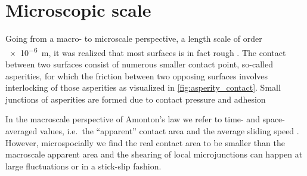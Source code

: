 










\section{Microscopic scale}
Going from a macro- to microscale perspective, a length scale of order
\SI{e-6}{m}, it was realized that most surfaces is in fact rough
\cite{mo_friction_2009}. The contact between two surfaces consist of numerous
smaller contact point, so-called asperities, for which the friction between two
opposing surfaces involves interlocking of those asperities as visualized in
\cref{fig:asperity_contact}. Small junctions of asperities are formed due
to contact pressure and adhesion \cite{kim_nano-scale_2009}

In the macroscale perspective of Amonton's law we refer to time- and
space-averaged values, i.e.\ the ``apparent'' contact area and the average
sliding speed \cite{gao_frictional_2004}. However, microspocially we find the
real contact area to be smaller than the macroscale apparent area and the
shearing of local microjunctions can happen at large fluctuations or in a
stick-slip fashion. 

